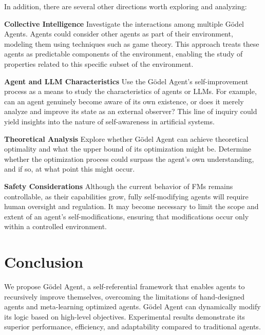 \documentclass[11pt]{article}
\newcommand{\godel}{G\"odel\xspace}
\newcommand{\framework}{Gödel Agent\xspace}
\begin{document}
In addition, there are several other directions worth exploring and analyzing:

\noindent\textbf{Collective Intelligence} \quad Investigate the interactions among multiple \godel Agents. Agents could consider other agents as part of their environment, modeling them using techniques such as game theory. This approach treats these agents as predictable components of the environment, enabling the study of properties related to this specific subset of the environment. 

\noindent\textbf{Agent and LLM Characteristics} \quad Use the \framework{}’s self-improvement process as a means to study the characteristics of agents or LLMs. For example, can an agent genuinely become aware of its own existence, or does it merely analyze and improve its state as an external observer? 
This line of inquiry could yield insights into the nature of self-awareness in artificial systems.

\noindent\textbf{Theoretical Analysis} \quad Explore whether \framework{} can achieve theoretical optimality and what the upper bound of its optimization might be. Determine whether the optimization process could surpass the agent’s own understanding, and if so, at what point this might occur.

\noindent\textbf{Safety Considerations} \quad Although the current behavior of FMs remains controllable, as their capabilities grow, fully self-modifying agents will require human oversight and regulation. It may become necessary to limit the scope and extent of an agent's self-modifications, ensuring that modifications occur only within a controlled environment.















\section{Conclusion}

We propose \framework, a self-referential framework that enables agents to recursively improve themselves, overcoming the limitations of hand-designed agents and meta-learning optimized agents.  \framework can dynamically modify its logic based on high-level objectives. Experimental results demonstrate its superior performance, efficiency, and adaptability compared to traditional agents. 
\end{document}

